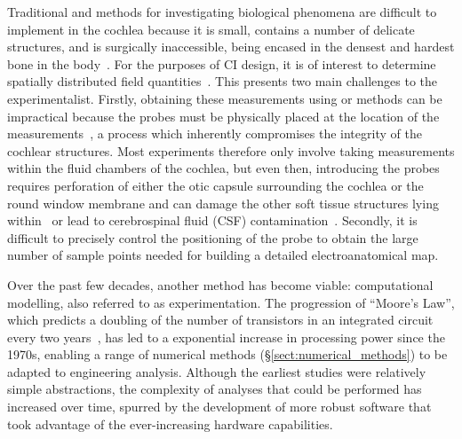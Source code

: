 Traditional \invivo{} and \invitro{} methods for investigating biological
phenomena are difficult to implement in the cochlea because it is small,
contains a number of delicate structures, and is surgically inaccessible, being
encased in the densest and hardest bone in the body~\cite{bast1949, dallos1996}.
For the purposes of CI design, it is of interest to determine spatially
distributed field quantities~\cite{vanpoucke2004identification}. This presents
two main challenges to the experimentalist. Firstly, obtaining these
measurements using \invivo{} or \invitro{} methods can be impractical because
the probes must be physically placed at the location of the
measurements~\cite{girzon1987,kral1998}, a process which inherently compromises
the integrity of the cochlear structures. Most experiments therefore only
involve taking measurements within the fluid chambers of the cochlea, but even
then, introducing the probes requires perforation of either the otic capsule
surrounding the cochlea or the round window membrane and can damage the other
soft tissue structures lying within~\cite{black1980} or lead to cerebrospinal
fluid (CSF) contamination~\cite[p. 113]{salt1986}. Secondly, it is difficult to
precisely control the positioning of the probe to obtain the large number of
sample points needed for building a detailed electroanatomical map.

Over the past few decades, another method has become viable: computational
modelling, also referred to as \insilico{} experimentation. The progression of
``Moore's Law'', which predicts a doubling of the number of transistors in an
integrated circuit every two years~\cite{moore1998}, has led to a exponential
increase in processing power since the 1970s, enabling a range of numerical
methods (\S\ref{sect:numerical_methods}) to be adapted to engineering analysis.
Although the earliest \insilico{} studies were relatively simple abstractions,
the complexity of analyses that could be performed has increased over time,
spurred by the development of more robust software that took advantage of the
ever-increasing hardware capabilities.

